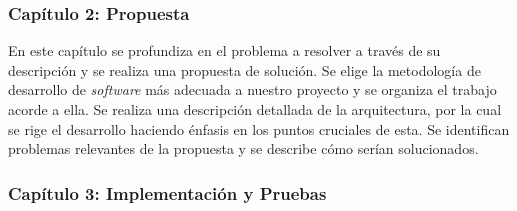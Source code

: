 \subsubsection*{Capítulo 2: Propuesta}
En este capítulo se profundiza en el problema a resolver a través de su descripción y se realiza una propuesta de solución. Se elige la metodología de desarrollo de \textit{software} más adecuada a nuestro proyecto y se organiza el trabajo acorde a ella. Se realiza una descripción detallada de la arquitectura, por la cual se rige el desarrollo haciendo énfasis en los puntos cruciales de esta. Se identifican problemas relevantes de la propuesta y se describe cómo serían solucionados.


%
%
 


\subsubsection*{Capítulo 3: Implementación y Pruebas}

